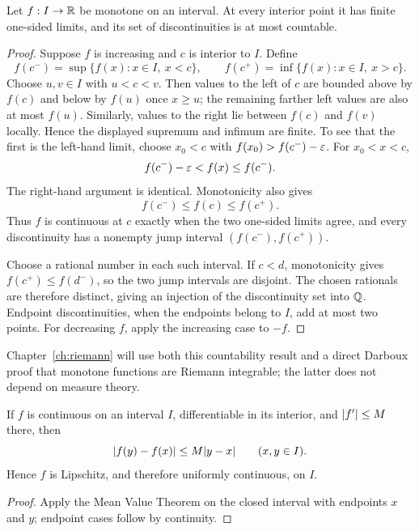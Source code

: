 \begin{theorem}
\label{thm:monotone-discontinuities}
Let \(f:I\to\mathbb{R}\) be monotone on an interval. At every interior point it
has finite one-sided limits, and its set of discontinuities is at most
countable.
\end{theorem}
\begin{proof}
Suppose \(f\) is increasing and \(c\) is interior to \(I\). Define
\[
f(c^-)=\sup\{f(x):x\in I,\ x<c\},
\qquad
f(c^+)=\inf\{f(x):x\in I,\ x>c\}.
\]
Choose $u,v\in I$ with $u<c<v$. Then values to the left of $c$ are bounded
above by $f(c)$ and below by $f(u)$ once $x\geq u$; the remaining farther
left values are also at most $f(u)$. Similarly, values to the right lie
between $f(c)$ and $f(v)$ locally. Hence the displayed supremum and
infimum are finite. To see that the first is the left-hand limit, choose
\(x_0<c\) with \(f(x_0)>f(c^-)-\varepsilon\). For \(x_0<x<c\),
\[
f(c^-)-\varepsilon<f(x)\leq f(c^-).
\]
The right-hand argument is identical. Monotonicity also gives
\[
f(c^-)\leq f(c)\leq f(c^+).
\]
Thus \(f\) is continuous at \(c\) exactly when the two one-sided limits
agree, and every discontinuity has a nonempty jump interval
\((f(c^-),f(c^+))\).

Choose a rational number in each such interval. If \(c<d\), monotonicity
gives \(f(c^+)\leq f(d^-)\), so the two jump intervals are disjoint.
The chosen rationals are therefore distinct, giving an injection of the
discontinuity set into \(\mathbb{Q}\). Endpoint discontinuities, when the endpoints
belong to \(I\), add at most two points. For decreasing \(f\), apply the
increasing case to \(-f\).
\end{proof}
Chapter~\ref{ch:riemann} will use both this countability result and a direct
Darboux proof that monotone functions are Riemann integrable; the latter
does not depend on measure theory.

\begin{corollary}
\label{cor:bounded-derivative-lipschitz}
If $f$ is continuous on an interval $I$, differentiable in its interior,
and $\lvert f'\rvert\leq M$ there, then
\[
\lvert f(y)-f(x)\rvert\leq M\lvert y-x\rvert
\qquad(x,y\in I).
\]
Hence $f$ is Lipschitz, and therefore uniformly continuous, on $I$.
\end{corollary}
\begin{proof}
Apply the Mean Value Theorem on the closed interval with endpoints $x$ and
$y$; endpoint cases follow by continuity.
\end{proof}

